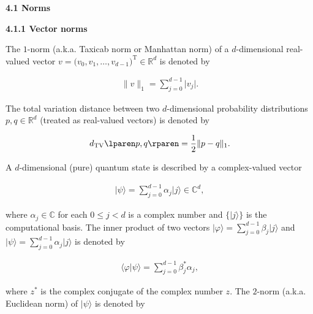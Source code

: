 \par\medskip\noindent\textbf{
4.1 Norms}\par




\par\medskip\noindent\textbf{
4.1.1 Vector norms}\par




The $1$-norm (a.k.a. Taxicab norm or Manhattan norm) of a $d$-dimensional real-valued vector $v=\lparen v_{0},v_{1},\dots,v_{d-1}\rparen^{\mathrm{T}}\in\mathbb{R}^{d}$ is denoted by\par


\[\begin{gathered}
\lVert v\rVert_{1}=\sum_{j=0}^{d-1}\lvert v_{j}\rvert.
\end{gathered}\]


The total variation distance between two $d$-dimensional probability distributions $p,q\in\mathbb{R}^{d}$ (treated as real-valued vectors) is denoted by\par


\[\begin{gathered}
d_{\textup{TV}}\lparen p,q\rparen=\frac{1}{2}\lVert p-q\rVert_{1}.
\end{gathered}\]




A $d$-dimensional (pure) quantum state is described by a complex-valued vector\par


\[\begin{gathered}
\lvert\psi\rangle=\sum_{j=0}^{d-1}\alpha_{j}\lvert j\rangle\in\mathbb{C}^{d},
\end{gathered}\]


where $\alpha_{j}\in\mathbb{C}$ for each $0\leq j<d$ is a complex number and $\{\lvert j\rangle\}$ is the computational basis.
The inner product of two vectors $\lvert\varphi\rangle=\sum_{j=0}^{d-1}\beta_{j}\lvert j\rangle$ and $\lvert\psi\rangle=\sum_{j=0}^{d-1}\alpha_{j}\lvert j\rangle$ is denoted by\par


\[\begin{gathered}
\langle\varphi|\psi\rangle=\sum_{j=0}^{d-1}\beta_{j}^{*}\alpha_{j},
\end{gathered}\]


where $z^{*}$ is the complex conjugate of the complex number $z$.
The $2$-norm (a.k.a. Euclidean norm) of $\lvert\psi\rangle$ is denoted by\par


